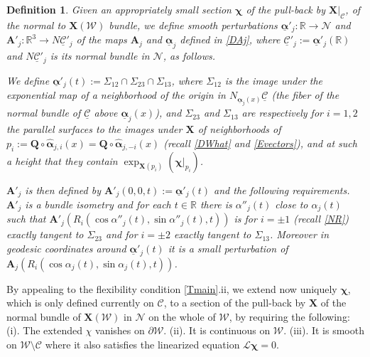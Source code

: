 \documentclass[12pt,namelimits,sumlimits]{amsart}
\newtheorem{definition}[theorem]{Definition}
\theoremstyle{remark}
\numberwithin{equation}{section}
\begin{document}
\addtocounter{equation}{1}
\begin{definition}
\label{DApj}
Given an appropriately small section ${\boldsymbol{\chi}}$ of the pull-back by $\left.{\boldsymbol{X}}\right|_{{\mathcal{C}}}$,
of the normal to ${\boldsymbol{X}}({{\mathcal{W}}})$ bundle,
we define smooth perturbations 
${\underline{\boldsymbol{\alpha}}}'_j:{\mathbb{R}}\to{{\mathcal{N}}}$
and
${\boldsymbol{A}}'_j:{\mathbb{R}}^3\to N{\underline{{\mathcal{C}}}}'_j$
of the maps 
${\boldsymbol{A}}_j$ and ${\underline{\boldsymbol{\alpha}}}_j$
defined in \ref{DAj},
where
${\underline{{\mathcal{C}}}}'_j:={\underline{\boldsymbol{\alpha}}}'_j({\mathbb{R}})$
and $N{\underline{{\mathcal{C}}}}'_j$ is its normal bundle in ${{\mathcal{N}}}$,
as follows.

We define ${\underline{\boldsymbol{\alpha}}}'_j(t):=\Sigma_{12}\cap\Sigma_{23}\cap\Sigma_{13}$,
where 
$\Sigma_{12}$ is the image under the exponential map of a neighborhood of the origin in
$N_{{\underline{\boldsymbol{\alpha}}}_j(x)}{\underline{{\mathcal{C}}}}$
(the fiber of the normal bundle of ${\underline{{\mathcal{C}}}}$ above ${\underline{\boldsymbol{\alpha}}}_j(x)$),
and $\Sigma_{23}$ and $\Sigma_{13}$
are respectively for $i=1,2$
the parallel surfaces to the images under ${\boldsymbol{X}}$ of neighborhoods
of $p_i:={\boldsymbol{Q}}\circ{\widehat{\boldsymbol{\alpha}}}_{{j,i}}(x)={\boldsymbol{Q}}\circ{\widehat{\boldsymbol{\alpha}}}_{j,-i}(x)$
(recall \ref{DWhat} and \ref{Evectors}),
and at such a height that they contain
$\exp_{{\boldsymbol{X}}(p_i)} (\left.{\boldsymbol{\chi}}\right|_{p_i} )$.

${\boldsymbol{A}}'_j$ 
is then defined by
${\boldsymbol{A}}'_j(0,0,t):={\underline{\boldsymbol{\alpha}}}'_j(t)$ and 
the following requirements.
${\boldsymbol{A}}'_j$ is a bundle isometry
and for each $t\in{\mathbb{R}}$ there is $\alpha''_j(t)$ close to $\alpha_j(t)$
such that 
${\boldsymbol{A}}'_j(R_i(\cos\alpha''_j(t),\sin\alpha''_j(t), t))$
is for $i=\pm1$ (recall \ref{NR}) exactly tangent to $\Sigma_{23}$ 
and for $i=\pm2$ exactly tangent to $\Sigma_{13}$.
Moreover in geodesic coordinates around ${\underline{\boldsymbol{\alpha}}}'_j(t)$ it is a small perturbation of 
${\boldsymbol{A}}_j(R_i(\cos\alpha_j(t),\sin\alpha_j(t), t))$.
\end{definition}

By appealing to the flexibility condition \ref{Tmain}.ii,
we extend now uniquely ${\boldsymbol{\chi}}$,
which is only defined currently on ${{\mathcal{C}}}$,
to a section of the pull-back by ${\boldsymbol{X}}$ of the normal bundle of ${\boldsymbol{X}}({{\mathcal{W}}})$ in ${{\mathcal{N}}}$
on the whole of ${{\mathcal{W}}}$,
by requiring the following:
\newline
(i).
The extended $\chi$ vanishes on $\partial{{\mathcal{W}}}$.
\newline
(ii). It is continuous on ${{\mathcal{W}}}$.
\newline
(iii). It is smooth on ${{\mathcal{W}}}\setminus{{\mathcal{C}}}$ where it also satisfies the linearized equation
${\ensuremath{\mathcal L}}{\boldsymbol{\chi}}=0$.
\end{document}
